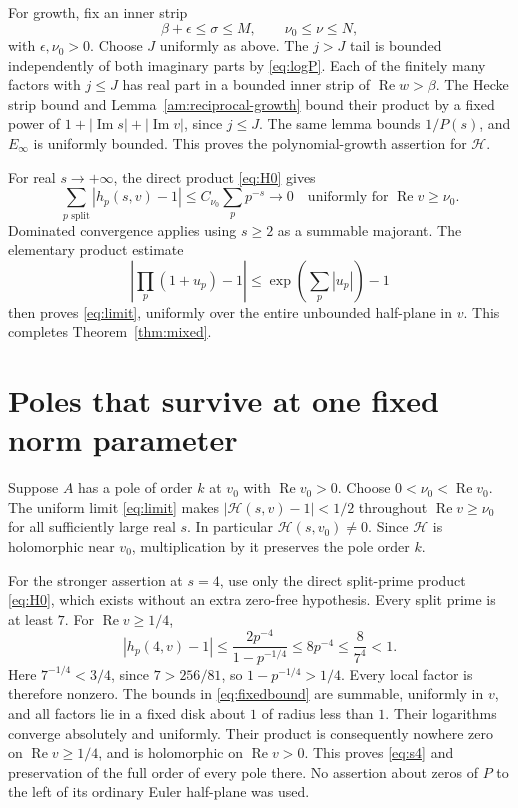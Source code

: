 \documentclass[11pt]{article}
\numberwithin{equation}{section}
\newcommand{\HH}{\mathcal H}
\newcommand{\Rea}{\operatorname{Re}}
\newcommand{\Ima}{\operatorname{Im}}
\begin{document}
For growth, fix an inner strip
\begin{equation}\label{eq:inner}
 \beta+\epsilon\le\sigma\le M,\qquad
 \nu_0\le\nu\le N,
\end{equation}
with $\epsilon,\nu_0>0$. Choose $J$ uniformly as above. The
$j>J$ tail is bounded independently of both imaginary parts by
\eqref{eq:logP}. Each of the finitely many factors with $j\le J$
has real part in a bounded inner strip of $\Rea w>\beta$.
The Hecke strip bound and Lemma~\ref{am:reciprocal-growth} bound their
product by a fixed power of
$1+|\Ima s|+|\Ima v|$, since $j\le J$.
The same lemma bounds $1/P(s)$, and $E_\infty$ is uniformly bounded.
This proves the polynomial-growth assertion for $\HH$.

For real $s\to+\infty$, the direct product \eqref{eq:H0} gives
\begin{equation}
 \sum_{p\text{ split}}|h_p(s,v)-1|
 \le C_{\nu_0}\sum_p p^{-s}\longrightarrow0
 \quad\text{uniformly for }\Rea v\ge\nu_0.
\end{equation}
Dominated convergence applies using $s\ge2$ as a summable
majorant. The elementary product estimate
\begin{equation}
 \left|\prod_p(1+u_p)-1\right|
 \le\exp\left(\sum_p|u_p|\right)-1
\end{equation}
then proves \eqref{eq:limit}, uniformly over the entire unbounded
half-plane in $v$. This completes Theorem~\ref{thm:mixed}.

\section{Poles that survive at one fixed norm parameter}

Suppose $A$ has a pole of order $k$ at $v_0$ with $\Rea v_0>0$.
Choose $0<\nu_0<\Rea v_0$. The uniform limit
\eqref{eq:limit} makes $|\HH(s,v)-1|<1/2$ throughout
$\Rea v\ge\nu_0$ for all sufficiently large real $s$.
In particular $\HH(s,v_0)\ne0$. Since $\HH$ is holomorphic
near $v_0$, multiplication by it preserves the pole order $k$.

For the stronger assertion at $s=4$, use only the direct
split-prime product \eqref{eq:H0}, which exists without an extra
zero-free hypothesis. Every split prime is at least $7$.
For $\Rea v\ge1/4$,
\begin{equation}\label{eq:fixedbound}
 |h_p(4,v)-1|
 \le\frac{2p^{-4}}{1-p^{-1/4}}
 \le8p^{-4}\le\frac{8}{7^4}<1.
\end{equation}
Here $7^{-1/4}<3/4$, since $7>256/81$, so
$1-p^{-1/4}>1/4$. Every local factor is therefore nonzero.
The bounds in \eqref{eq:fixedbound} are summable, uniformly in $v$,
and all factors lie in a fixed disk about $1$ of radius less than
$1$. Their logarithms converge absolutely and uniformly.
Their product is consequently nowhere zero on
$\Rea v\ge1/4$, and is holomorphic on $\Rea v>0$.
This proves \eqref{eq:s4} and preservation of the full order of
every pole there. No assertion about zeros of $P$ to the left of
its ordinary Euler half-plane was used.
\end{document}
